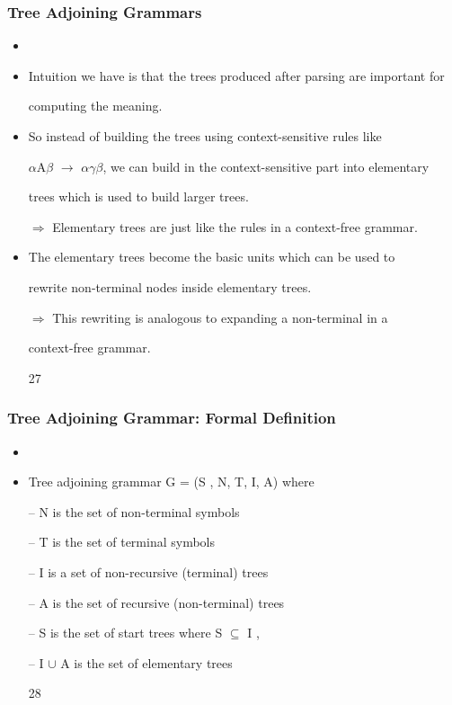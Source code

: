 \documentclass[compress,color=usenames]{beamer}
\begin{document}
\begin{frame}
\frametitle{Tree Adjoining Grammars}

\begin{itemize}
\item




\item Intuition we have is that the trees produced after parsing are important for


computing the meaning.





\item So instead of building the trees using context-sensitive rules like


$\alpha$A$\beta$ $\rightarrow$ $\alpha$$\gamma$$\beta$, we can build in the context-sensitive part into elementary


trees which is used to build larger trees.


$\Rightarrow$ Elementary trees are just like the rules in a context-free grammar.





\item The elementary trees become the basic units which can be used to


rewrite non-terminal nodes inside elementary trees.


$\Rightarrow$ This rewriting is analogous to expanding a non-terminal in a


context-free grammar.


27




\end{itemize}

\end{frame}

\begin{frame}
\frametitle{Tree Adjoining Grammar: Formal Deﬁnition}

\begin{itemize}
\item




\item Tree adjoining grammar G = (S , N, T, I, A) where


-- N is the set of non-terminal symbols


-- T is the set of terminal symbols


-- I is a set of non-recursive (terminal) trees


-- A is the set of recursive (non-terminal) trees


-- S is the set of start trees where S $\subseteq$ I ,


-- I $\cup$ A is the set of elementary trees


28




\end{itemize}

\end{frame}
\end{document}
